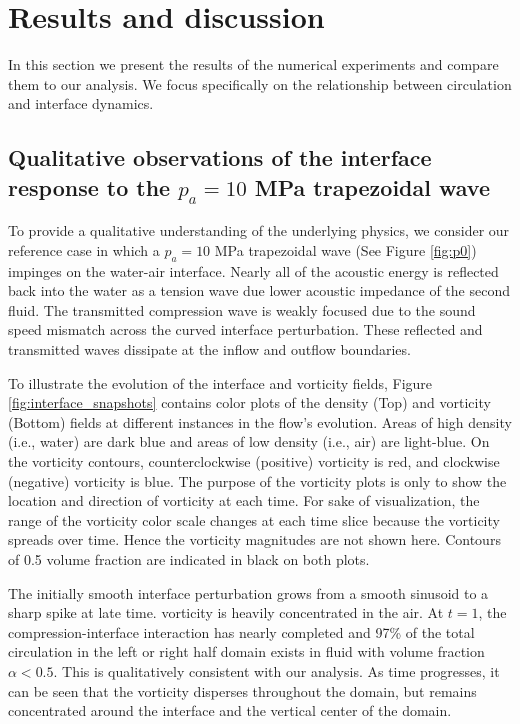 \section{Results and discussion}%
\label{sec:results}%
%
In this section we present the results of the numerical experiments
and compare them to our analysis. We focus specifically on the
relationship between circulation and interface dynamics.
%
%
\subsection{Qualitative observations of the interface response to the $p_a=10$ MPa trapezoidal wave}
\label{subsec:Qualitative}
To provide a qualitative understanding of the underlying physics, we
consider our reference case in which a $p_a=10$ MPa trapezoidal wave
(See Figure \ref{fig:p0}) impinges on the water-air interface. Nearly
all of the acoustic energy is reflected back into the
water as a tension wave due lower acoustic impedance of the second
fluid. The transmitted compression wave is weakly focused due to the sound
speed mismatch across the curved interface perturbation. These
reflected and transmitted waves dissipate at the inflow and outflow
boundaries.

To illustrate the evolution of the interface and vorticity fields,
Figure \ref{fig:interface_snapshots} contains color plots of the
density (Top) and vorticity (Bottom) fields at different instances in
the flow's evolution. Areas of high density (i.e., water) are dark
blue and areas of low density (i.e., air) are light-blue. On the
vorticity contours, counterclockwise (positive) vorticity is red, and
clockwise (negative) vorticity is blue. The purpose of the vorticity
plots is only to show the location and direction of vorticity at each
time. For sake of visualization, the range of the vorticity color
scale changes at each time slice because the vorticity spreads over
time. Hence the vorticity magnitudes are not shown here. Contours of
0.5 volume fraction are indicated in black on both plots. 

The initially smooth interface perturbation grows from a smooth
sinusoid to a sharp spike at late time.  vorticity is heavily
concentrated in the air. At $t=1$, the compression-interface
interaction has nearly completed and 97\% of the total circulation in
the left or right half domain exists in fluid with volume fraction
$\alpha<0.5$. This is qualitatively consistent with our analysis. As
time progresses, it can be seen that the vorticity disperses
throughout the domain, but remains concentrated around the interface
and the vertical center of the domain.

